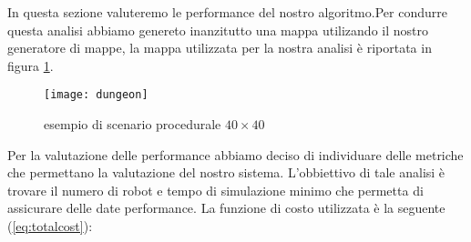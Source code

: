 In questa sezione valuteremo le performance del nostro algoritmo.Per condurre questa analisi abbiamo genereto inanzitutto una mappa utilizando il nostro generatore di mappe, la mappa utilizzata per la nostra analisi è riportata in figura \ref{fig:dungeon}.
\begin{figure}[!htb]
\centering
\texttt{[image: dungeon]}
\caption{esempio di scenario procedurale $40\times40$}
\label{fig:dungeon}
\end{figure}

Per la valutazione delle performance abbiamo deciso di individuare delle metriche che permettano la valutazione del nostro sistema. L'obbiettivo di tale analisi è trovare il numero di robot e tempo di simulazione minimo che permetta di assicurare delle date performance.
La funzione di costo utilizzata è la seguente (\ref{eq:totalcost}):

